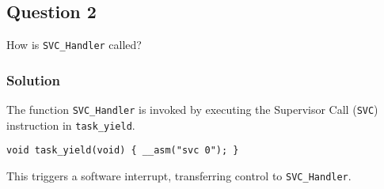 \subsection*{Question 2}

How is \texttt{SVC\_Handler} called?

\subsubsection*{Solution}

The function \texttt{SVC\_Handler} is invoked by executing the Supervisor Call (\texttt{SVC}) instruction in \texttt{task\_yield}.
\begin{verbatim}
void task_yield(void) { __asm("svc 0"); }
\end{verbatim}
This triggers a software interrupt, transferring control to \texttt{SVC\_Handler}.
